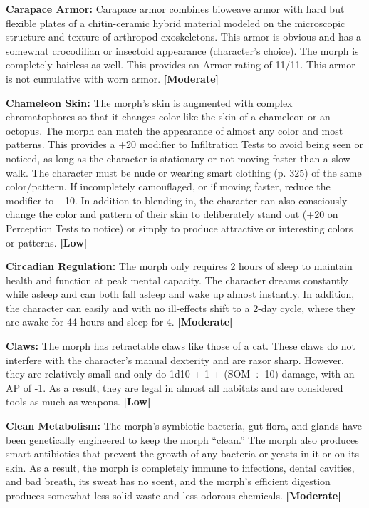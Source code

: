 \textbf{Carapace Armor:} Carapace armor combines bioweave armor with hard but flexible plates of a chitin-ceramic hybrid material modeled on the microscopic structure and texture of arthropod exoskeletons. This armor is obvious and has a somewhat crocodilian or insectoid appearance (character’s choice). The morph is completely hairless as well. This provides an Armor rating of 11/11. This armor is not cumulative with worn armor. \textbf{[Moderate]}

\textbf{Chameleon Skin:} The morph’s skin is augmented with complex chromatophores so that it changes color like the skin of a chameleon or an octopus. The morph can match the appearance of almost any color and most patterns. This provides a +20 modifier to Infiltration Tests to avoid being seen or noticed, as long as the character is stationary or not moving faster than a slow walk. The character must be nude or wearing smart clothing (p. 325) of the same color/pattern. If incompletely camouflaged, or if moving faster, reduce the modifier to +10. In addition to blending in, the character can also consciously change the color and pattern of their skin to deliberately stand out (+20 on Perception Tests to notice) or simply to produce attractive or interesting colors or patterns. \textbf{[Low]}

\textbf{Circadian Regulation:} The morph only requires 2 hours of sleep to maintain health and function at peak mental capacity. The character dreams constantly while asleep and can both fall asleep and wake up almost instantly. In addition, the character can easily and with no ill-effects shift to a 2-day cycle, where they are awake for 44 hours and sleep for 4. \textbf{[Moderate]}

\textbf{Claws:} The morph has retractable claws like those of a cat. These claws do not interfere with the character’s manual dexterity and are razor sharp. However, they are relatively small and only do 1d10 + 1 + (SOM $\div$ 10) damage, with an AP of -1. As a result, they are legal in almost all habitats and are considered tools as much as weapons. \textbf{[Low]}

\textbf{Clean Metabolism:} The morph’s symbiotic bacteria, gut flora, and glands have been genetically engineered to keep the morph ``clean.'' The morph also produces smart antibiotics that prevent the growth of any bacteria or yeasts in it or on its skin. As a result, the morph is completely immune to infections, dental cavities, and bad breath, its sweat has no scent, and the morph’s efficient digestion produces somewhat less solid waste and less odorous chemicals. \textbf{[Moderate]}

